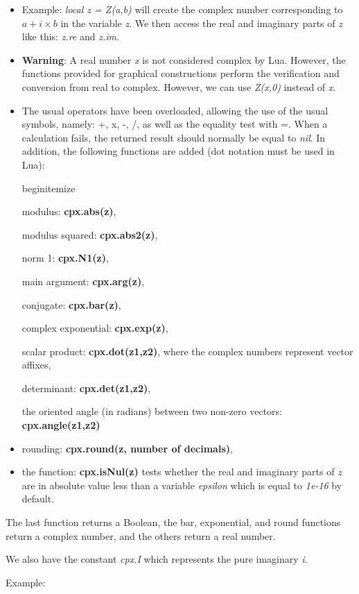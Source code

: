 \begin{itemize}
\item Example: \emph{local z = Z(a,b)} will create the complex number corresponding to \(a + i\times b\) in the variable \emph{z}. We then access the real and imaginary parts of \emph{z} like this: \emph{z.re} and \emph{z.im}.
\item \textbf{Warning}: A real number \emph{x} is not considered complex by Lua. However, the functions provided for graphical constructions perform the verification and conversion from real to complex. However, we can use \emph{Z(x,0)} instead of \emph{x}.
\item The usual operators have been overloaded, allowing the use of the usual symbols, namely: +, x, -, /, as well as the equality test with =. When a calculation fails, the returned result should normally be equal to \emph{nil}.
In addition, the following functions are added (dot notation must be used in Lua):

begin{itemize}

modulus: \textbf{cpx.abs(z)},

modulus squared: \textbf{cpx.abs2(z)},

norm 1: \textbf{cpx.N1(z)},

main argument: \textbf{cpx.arg(z)},

conjugate: \textbf{cpx.bar(z)},

complex exponential: \textbf{cpx.exp(z)},

scalar product: \textbf{cpx.dot(z1,z2)}, where the complex numbers represent vector affixes,

determinant: \textbf{cpx.det(z1,z2)},

the oriented angle (in radians) between two non-zero vectors: \textbf{cpx.angle(z1,z2)}
\item rounding: \textbf{cpx.round(z, number of decimals)},
\item the function: \textbf{cpx.isNul(z)} tests whether the real and imaginary parts of \emph{z} are in absolute value less than a variable \emph{epsilon} which is equal to \emph{1e-16} by default.
\end{itemize}

The last function returns a Boolean, the bar, exponential, and round functions return a complex number, and the others return a real number.

We also have the constant \emph{cpx.I} which represents the pure imaginary \emph{i}.

Example:

